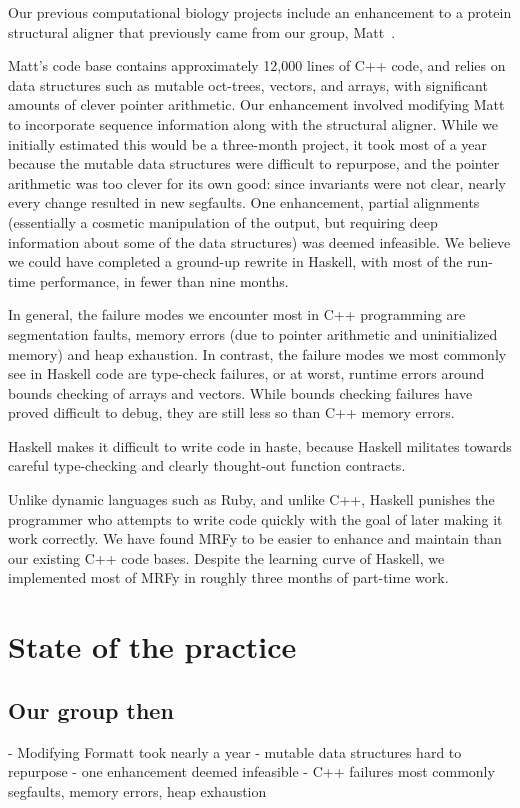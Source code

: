 \documentclass[preprint,nonatbib,blockstyle,nocopyrightspace,times]{sigplanconf}
\let\cite\citep
\begin{document}
Our previous computational biology projects include an enhancement to a protein 
structural aligner that previously came from our group, Matt~\cite{matt}.

Matt's code base contains approximately 12,000 lines of C++ code, and relies on 
data structures such as mutable oct-trees, vectors, and arrays, with 
significant amounts of clever pointer arithmetic.
Our enhancement involved 
modifying Matt to incorporate sequence information along with the structural 
aligner.
While we initially estimated this would be a three-month project, it 
took most of a year because the mutable data structures were difficult to 
repurpose, and the pointer arithmetic was too clever for its own good: since 
invariants were not clear, nearly every change resulted in new segfaults.
One 
enhancement, partial alignments (essentially a cosmetic manipulation of the 
output, but requiring deep information about some of the data structures) was 
deemed infeasible.
We believe we could have completed a ground-up rewrite in 
Haskell, with most of the run-time performance, in fewer than nine months.


In general, the failure modes we encounter most in C++ programming are 
segmentation faults, memory errors (due to pointer arithmetic and uninitialized 
memory) and heap exhaustion.
In contrast, the failure modes we most commonly 
see in Haskell code are type-check failures, or at worst, runtime errors around 
bounds checking of arrays and vectors.
While bounds checking failures have 
proved difficult to debug, they are still less so than C++ memory errors.


Haskell makes it difficult to write code in haste, because Haskell militates 
towards careful type-checking and clearly thought-out function contracts.

Unlike dynamic languages such as Ruby, and unlike C++, Haskell punishes the 
programmer who attempts to write code quickly with the goal of later making it 
work correctly.
We have found MRFy to be easier to enhance and maintain than 
our existing C++ code bases.
Despite the learning curve of Haskell, we 
implemented most of MRFy in roughly three months of part-time work.

 
\section{State of the practice}

\subsection{Our group then}
 - Modifying Formatt took nearly a year
 - mutable data structures hard to repurpose
 - one enhancement deemed infeasible
 - C++ failures most commonly segfaults, memory errors, heap exhaustion
\end{document}
